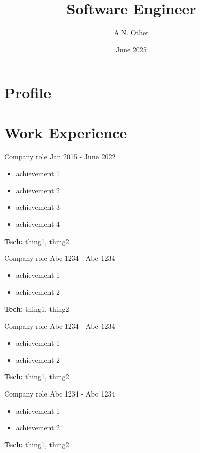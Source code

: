 \documentclass[9pt]{smart-cv}
\author{A.N. Other}
\title{Software Engineer}
\date{June 2025}
\begin{document}
  \begin{two-col}
    {
      \section*{Profile}

      \lipsum[1]
    }

    \section{Work Experience}

    \begin{job}
      {Company}
      {role}
      {Jan 2015 - June 2022}
      \begin{itemize}
        \item achievement 1
        \item achievement 2
        \item achievement 3
        \item achievement 4
      \end{itemize}
      \textbf{Tech:} thing1, thing2
    \end{job}

    \begin{job}
      {Company}
      {role}
      {Abc 1234 - Abc 1234}
      \begin{itemize}
        \item achievement 1
        \item achievement 2
      \end{itemize}
      \textbf{Tech:} thing1, thing2
    \end{job}

    \begin{job}
      {Company}
      {role}
      {Abc 1234 - Abc 1234}
      \begin{itemize}
        \item achievement 1
        \item achievement 2
      \end{itemize}
      \textbf{Tech:} thing1, thing2
    \end{job}

    \begin{job}
      {Company}
      {role}
      {Abc 1234 - Abc 1234}
      \begin{itemize}
        \item achievement 1
        \item achievement 2
      \end{itemize}
      \textbf{Tech:} thing1, thing2
    \end{job}


\end{two-col}
\end{document}
